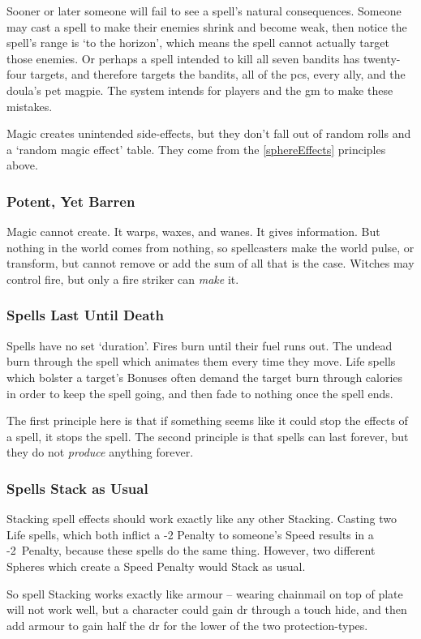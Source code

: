 \begin{multicols}{2}
Sooner or later someone will fail to see a spell's natural consequences.
Someone may cast a spell to make their enemies shrink and become weak, then notice the spell's range is `to the horizon', which means the spell cannot actually target those enemies.
Or perhaps a spell intended to kill all seven bandits has twenty-four targets, and therefore targets the bandits, all of the \glspl{pc}, every ally, and the \gls{doula}'s pet magpie.
The system intends for players and the \gls{gm} to make these mistakes.

Magic creates unintended side-effects, but they don't fall out of random rolls and a `random magic effect' table.
They come from the \ref{sphereEffects} principles above.

\subsubsection{Potent, Yet Barren}

Magic cannot create.
It warps, waxes, and wanes.
It gives information.
But nothing in the world comes from nothing, so spellcasters make the world pulse, or transform, but cannot remove or add the sum of all that is the case.
Witches may control fire, but only a fire striker can \textit{make} it.

\subsubsection{Spells Last Until Death}

Spells have no set `duration'.
Fires burn until their fuel runs out.
The undead burn through the spell which animates them every time they move.
Life spells which bolster a target's Bonuses often demand the target burn through calories in order to keep the spell going, and then fade to nothing once the spell ends.

The first principle here is that if something seems like it could stop the effects of a spell, it stops the spell.
The second principle is that spells can last forever, but they do not \emph{produce} anything forever.

\subsubsection{Spells Stack as Usual}

Stacking spell effects should work exactly like any other Stacking.%
Casting two Life spells, which both inflict a -2 Penalty to someone's Speed results in a -2~Penalty, because these spells do the same thing.
However, two different Spheres which create a Speed Penalty would Stack as usual.

So spell Stacking works exactly like armour -- wearing chainmail on top of plate will not work well, but a character could gain \gls{dr} through a touch hide, and then add armour to gain half the \gls{dr} for the lower of the two protection-types.

\end{multicols}

